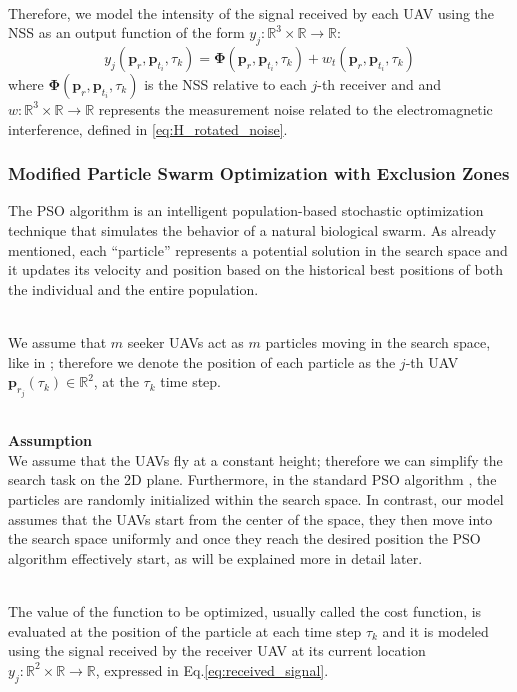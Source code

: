 \documentclass[main]{subfiles}
\begin{document}
\noindent\\
Therefore, we model the intensity of the signal received by each UAV using the NSS
as an output function of the form \( y_j : \mathbb{R}^3 
\times \mathbb{R} \rightarrow \mathbb{R} \):
\begin{equation}
y_j(\mathbf{p}_{r}, \mathbf{p}_{t_i}, \tau_k) = \mathbf{\Phi}(\mathbf{p}_{r}, \mathbf{p}_{t_i}, \tau_k) + 
w_t(\mathbf{p}_{r}, \mathbf{p}_{t_i}, \tau_k)
\label{eq:received_signal}
\end{equation}
where $\mathbf{\Phi}(\mathbf{p}_{r}, \mathbf{p}_{t_i}, \tau_k)$ is the NSS
relative to each $j$-th receiver and 
and \( w : \mathbb{R}^3 \times \mathbb{R} \rightarrow \mathbb{R} \) 
represents the measurement noise related to the electromagnetic interference,
defined in \ref{eq:H_rotated_noise}.

\subsubsection{Modified Particle Swarm Optimization with Exclusion Zones}
\label{sec:PSO}
The PSO algorithm is an intelligent population-based stochastic optimization technique 
that simulates the behavior of a natural biological swarm. 
As already mentioned, each “particle” represents a potential solution in the search space
and it updates its velocity and position based on the historical best positions 
of both the individual and the entire population.
 
\noindent\\
We assume that $m$ seeker UAVs act as $m$ particles moving in the search space, 
like in \cite{3}; therefore we denote the position of each particle as the $j$-th UAV
$\mathbf{p}_{r_j}(\tau_k) \in \mathbb{R}^2$, at the $\tau_k$ time step.

\noindent\\
\textbf{Assumption}\noindent\\
We assume that the UAVs fly at a constant height; therefore we can
simplify the search task on the 2D plane.
Furthermore, in the standard PSO algorithm \cite{PSO_original}, the particles are randomly 
initialized within the search space. In contrast, our model assumes that the UAVs 
start from the center of the space, they then move into the search space 
uniformly and once they reach the desired position the PSO algorithm
effectively start, as will be explained more in detail later.

\noindent\\
The value of the function to be optimized, usually
called the cost function, is evaluated at the position of the particle at 
each time step $\tau_k$ and it is modeled using the signal 
received by the receiver UAV at its current location
\( y_j : \mathbb{R}^2 
\times \mathbb{R} \rightarrow \mathbb{R} \), expressed in 
Eq.\ref{eq:received_signal}.
\end{document}
